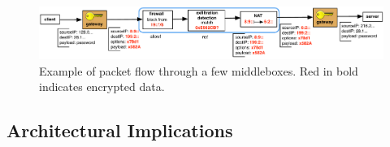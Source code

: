\begin{figure}[t!]
\begin{center}
  \includegraphics[width=6.7in]{fig/packetpath.pdf}
\caption{Example of packet flow through a few middleboxes. Red in bold indicates encrypted data. \label{fig:packetflow} }
\end{center}
\end{figure}


%
%
%




\subsection{Architectural Implications} 
\label{sec:bbarch}

